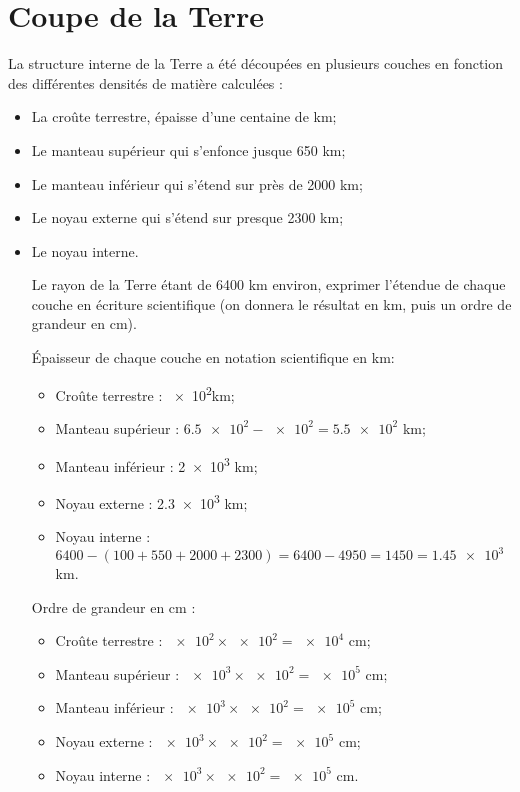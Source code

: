 \documentclass[a4paper,11pt]{exam}
\begin{document}
\section{Coupe de la Terre}	
	La structure interne de la Terre a été découpées en plusieurs couches en fonction des différentes densités de matière calculées :
	\begin{itemize}
		\item La croûte terrestre, épaisse d'une centaine de km;
		\item Le manteau supérieur qui s'enfonce jusque 650 km;
		\item Le manteau inférieur qui s'étend sur près de \num{2000} km;
		\item Le noyau externe qui s'étend sur presque \num{2300} km;
		\item Le noyau interne.
		
		\begin{questions}
			\question Le rayon de la Terre étant de \num{6400} km environ, exprimer l'étendue de chaque couche en écriture scientifique (on donnera le résultat en km, puis un ordre de grandeur en cm).
			
			\begin{solution}
				\'Epaisseur de chaque couche en notation scientifique en km:
				\begin{itemize}
					\item Croûte terrestre : \num{e2}km;
					\item Manteau supérieur : $\num{6.5e2} - \num{e2} = \num{5.5e2}$ km;
					\item Manteau inférieur : \num{2e3} km;
					\item Noyau externe : \num{2.3e3} km;
					\item Noyau interne : $\num{6400} - (\num{100} + \num{550} + \num{2000} + \num{2300}) = \num{6400} - \num{4950} = \num{1450} = \num{1.45e3}$ km.\\
				\end{itemize}
				
				Ordre de grandeur en cm :
				\begin{itemize}
					\item Croûte terrestre : $\num{e2} \times \num{e2} = \num{e4}$ cm;
					\item Manteau supérieur : $\num{e3} \times \num{e2} =  \num{e5}$ cm;
					\item Manteau inférieur : $\num{e3} \times \num{e2} =  \num{e5}$ cm;
					\item Noyau externe : $\num{e3} \times \num{e2} =  \num{e5}$ cm;
					\item Noyau interne : $\num{e3} \times \num{e2} =  \num{e5}$ cm.
				\end{itemize}
			\end{solution}
		\end{questions}
	\end{itemize}
	\label{LastPage}
\end{document}
